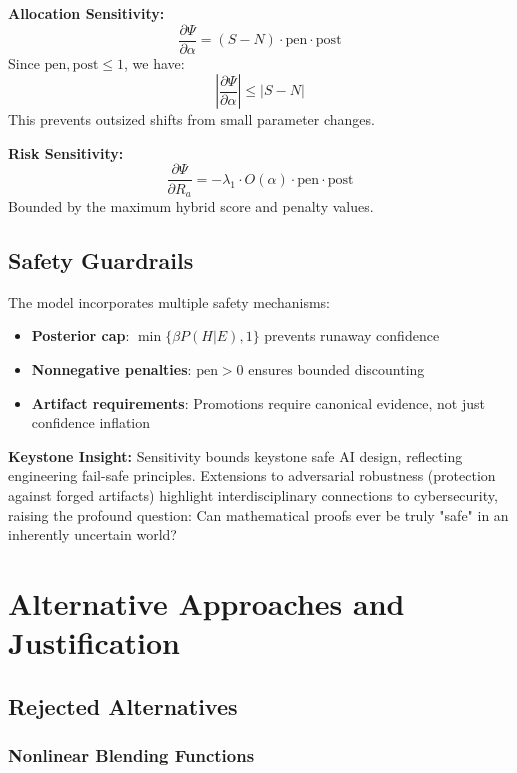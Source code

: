 \documentclass[12pt,a4paper]{article}
\theoremstyle{definition}
\theoremstyle{remark}
\begin{document}
\begin{proofbox}
\textbf{Allocation Sensitivity:}
$$\frac{\partial \Psi}{\partial \alpha} = (S - N) \cdot \text{pen} \cdot \text{post}$$
Since $\text{pen}, \text{post} \leq 1$, we have:
$$\left|\frac{\partial \Psi}{\partial \alpha}\right| \leq |S - N|$$
This prevents outsized shifts from small parameter changes.

\textbf{Risk Sensitivity:}
$$\frac{\partial \Psi}{\partial R_a} = -\lambda_1 \cdot O(\alpha) \cdot \text{pen} \cdot \text{post}$$
Bounded by the maximum hybrid score and penalty values.
\end{proofbox}

\subsection{Safety Guardrails}

The model incorporates multiple safety mechanisms:
\begin{itemize}
    \item \textbf{Posterior cap}: $\min\{\beta P(H|E), 1\}$ prevents runaway confidence
    \item \textbf{Nonnegative penalties}: $\text{pen} > 0$ ensures bounded discounting
    \item \textbf{Artifact requirements}: Promotions require canonical evidence, not just confidence inflation
\end{itemize}

\begin{reflectionbox}
\textbf{Keystone Insight:} Sensitivity bounds keystone safe AI design, reflecting engineering fail-safe principles. Extensions to adversarial robustness (protection against forged artifacts) highlight interdisciplinary connections to cybersecurity, raising the profound question: Can mathematical proofs ever be truly "safe" in an inherently uncertain world?
\end{reflectionbox}

\section{Alternative Approaches and Justification}

\subsection{Rejected Alternatives}

\subsubsection{Nonlinear Blending Functions}
\end{document}
